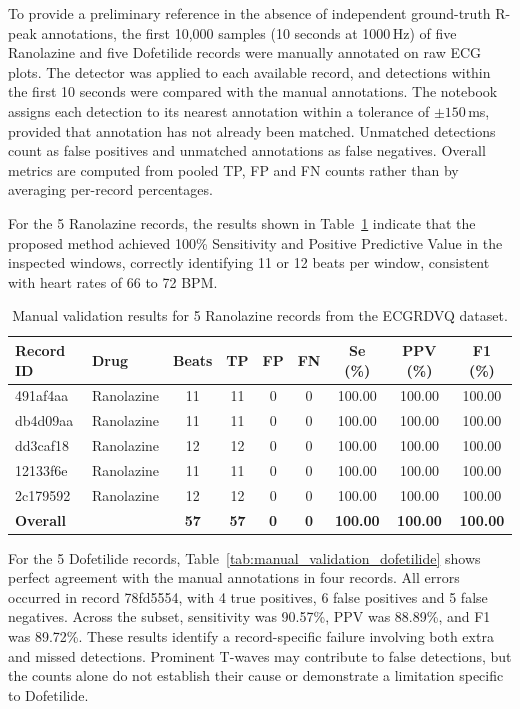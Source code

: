 \documentclass[11pt]{article}
\begin{document}
To provide a preliminary reference in the absence of independent ground-truth R-peak annotations, the first 10,000 samples (10 seconds at 1000\,Hz) of five Ranolazine and five Dofetilide records were manually annotated on raw ECG plots. The detector was applied to each available record, and detections within the first 10 seconds were compared with the manual annotations. The notebook assigns each detection to its nearest annotation within a tolerance of $\pm150$\,ms, provided that annotation has not already been matched. Unmatched detections count as false positives and unmatched annotations as false negatives. Overall metrics are computed from pooled TP, FP and FN counts rather than by averaging per-record percentages.

For the 5 Ranolazine records, the results shown in Table~\ref{tab:manual_validation_ranolazine} indicate that the proposed method achieved 100\% Sensitivity and Positive Predictive Value in the inspected windows, correctly identifying 11 or 12 beats per window, consistent with heart rates of 66 to 72 BPM.

\begin{table}[h]
\centering
\caption{Manual validation results for 5 Ranolazine records from the ECGRDVQ dataset.}
\label{tab:manual_validation_ranolazine}
\begin{tabular}{llccccccc}
\toprule
\textbf{Record ID} & \textbf{Drug} & \textbf{Beats} & \textbf{TP} & \textbf{FP} & \textbf{FN} & \textbf{Se (\%)} & \textbf{PPV (\%)} & \textbf{F1 (\%)} \\
\midrule
491af4aa & Ranolazine & 11 & 11 & 0 & 0 & 100.00 & 100.00 & 100.00 \\
db4d09aa & Ranolazine & 11 & 11 & 0 & 0 & 100.00 & 100.00 & 100.00 \\
dd3caf18 & Ranolazine & 12 & 12 & 0 & 0 & 100.00 & 100.00 & 100.00 \\
12133f6e & Ranolazine & 11 & 11 & 0 & 0 & 100.00 & 100.00 & 100.00 \\
2c179592 & Ranolazine & 12 & 12 & 0 & 0 & 100.00 & 100.00 & 100.00 \\
\midrule
\textbf{Overall} & & \textbf{57} & \textbf{57} & \textbf{0} & \textbf{0} & \textbf{100.00} & \textbf{100.00} & \textbf{100.00} \\
\bottomrule
\end{tabular}
\end{table}


For the 5 Dofetilide records, Table~\ref{tab:manual_validation_dofetilide} shows perfect agreement with the manual annotations in four records. All errors occurred in record 78fd5554, with 4 true positives, 6 false positives and 5 false negatives. Across the subset, sensitivity was 90.57\%, PPV was 88.89\%, and F1 was 89.72\%. These results identify a record-specific failure involving both extra and missed detections. Prominent T-waves may contribute to false detections, but the counts alone do not establish their cause or demonstrate a limitation specific to Dofetilide.
\end{document}
